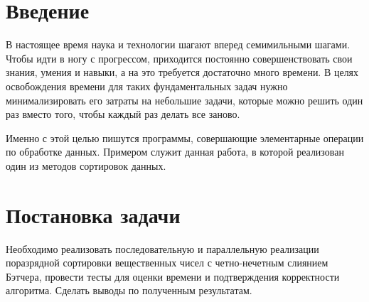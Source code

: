 \documentclass{report}
\begin{document}
\setcounter{page}{2}

\tableofcontents
\newpage

\section*{Введение}
В настоящее время наука и технологии шагают вперед семимильными шагами. Чтобы идти в ногу с прогрессом, приходится постоянно совершенствовать свои знания, умения и навыки, а на это требуется достаточно много времени. В целях освобождения времени для таких фундаментальных задач нужно минимализировать его затраты на небольшие задачи, которые можно решить один раз вместо того, чтобы каждый раз делать все заново.
\par Именно с этой целью пишутся программы, совершающие элементарные операции по обработке данных. Примером служит данная работа, в которой реализован один из методов сортировок данных.
\newpage

\section*{Постановка задачи}
Необходимо реализовать последовательную и параллельную реализации поразрядной сортировки вещественных чисел с четно-нечетным слиянием Бэтчера, провести тесты для оценки времени и подтверждения корректности алгоритма. Сделать выводы по полученным результатам.
\newpage

\end{document}
